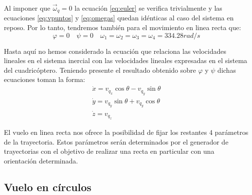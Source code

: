 \documentclass[main]{subfiles}
\begin{document}
Al imponer que $\vec{\omega}_q=0$ la ecuaci\'on \ref{eq:euler} se verifica trivialmente y las ecuaciones \ref{eq:vpuntos} y \ref{eq:omegas} quedan id\'enticas al caso del sistema en reposo. Por lo tanto, tendremos tambi\'en para el movimiento en linea recta que:
\begin{equation}
\varphi=0 \quad \psi=0 \quad \omega_1=\omega_2=\omega_3=\omega_4 = 334.28 rad/s
\end{equation}

Hasta aqu\'i no hemos considerado la ecuaci\'on que relaciona las velocidades lineales en el sistema inercial con las velocidades lineales expresadas en el sistema del cuadric\'optero. Teniendo presente el resultado obtenido sobre $\varphi$ y $\psi$ dichas ecuaciones toman la forma:
\begin{equation}\begin{array}{c}
\dot{x}=v_{q_x}\cos\theta-v_{q_y}\sin\theta\\
\dot{y}=v_{q_y}\sin\theta+v_{q_y}\cos\theta\\
\dot{z}=v_{q_z}
\end{array}
\end{equation} 

El vuelo en linea recta nos ofrece la posibilidad de fijar los restantes 4 par\'ametros de la trayectoria. Estos par\'ametros ser\'an determinados por el generador de trayectorias con el objetivo de realizar una recta en particular con una orientaci\'on determinada. 

\subsection{Vuelo en c\'irculos}
\end{document}
